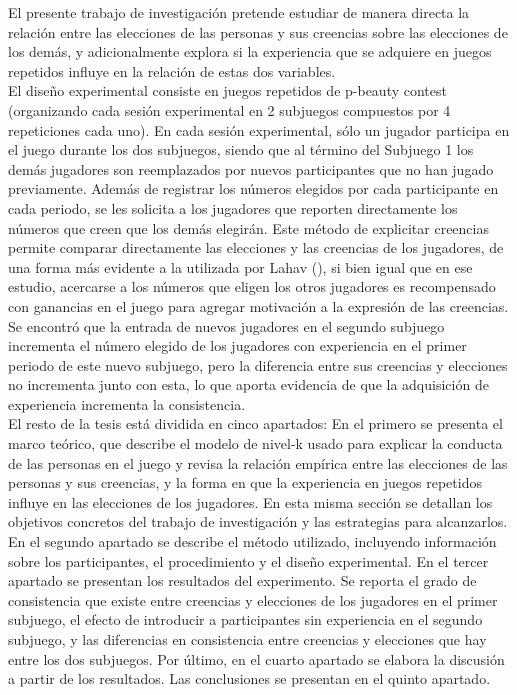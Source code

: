El presente trabajo de investigación pretende estudiar de manera directa la relación entre las elecciones de las personas y sus creencias sobre las elecciones de los demás, y adicionalmente explora si la experiencia que se adquiere en juegos repetidos influye en la relación de estas dos variables.\\

El diseño experimental consiste en juegos repetidos de p-beauty contest (organizando cada sesión experimental en 2 subjuegos compuestos por 4 repeticiones cada uno). En cada sesión experimental, sólo un jugador participa en el juego durante los dos subjuegos, siendo que al término del Subjuego 1 los demás jugadores son reemplazados por nuevos participantes que no han jugado previamente. Además de registrar los números elegidos por cada participante en cada periodo, se les solicita a los jugadores que reporten directamente los números que creen que los demás elegirán. Este método de explicitar creencias permite comparar directamente las elecciones y las creencias de los jugadores, de una forma más evidente a la utilizada por Lahav (\citeyear{Lahav}), si bien igual que en ese estudio, acercarse a los números que eligen los otros jugadores es recompensado con ganancias en el juego para agregar motivación a la expresión de las creencias.\\

Se encontró que la entrada de nuevos jugadores en el segundo subjuego incrementa el número elegido de los jugadores con experiencia en el primer periodo de este nuevo subjuego, pero la diferencia entre sus creencias y elecciones no incrementa junto con esta, lo que aporta evidencia de que la adquisición de experiencia incrementa la consistencia.\\

El resto de la tesis está dividida en cinco apartados: En el primero se presenta el marco teórico, que describe el modelo de nivel-k usado para explicar la conducta de las personas en el juego y revisa la relación empírica entre las elecciones de las personas y sus creencias, y la forma en que la experiencia en juegos repetidos influye en las elecciones de los jugadores. En esta misma sección se detallan los objetivos concretos del trabajo de investigación y las estrategias para alcanzarlos. En el segundo apartado se describe el método utilizado, incluyendo información sobre los participantes, el procedimiento y el diseño experimental. En el tercer apartado se presentan los resultados del experimento. Se reporta el grado de consistencia que existe entre creencias y elecciones de los jugadores en el primer subjuego, el efecto de introducir a participantes sin experiencia en el segundo subjuego, y las diferencias en consistencia entre creencias y elecciones que hay entre los dos subjuegos. Por último, en el cuarto apartado se elabora la discusión a partir de los resultados. Las conclusiones se presentan en el quinto apartado.\\
